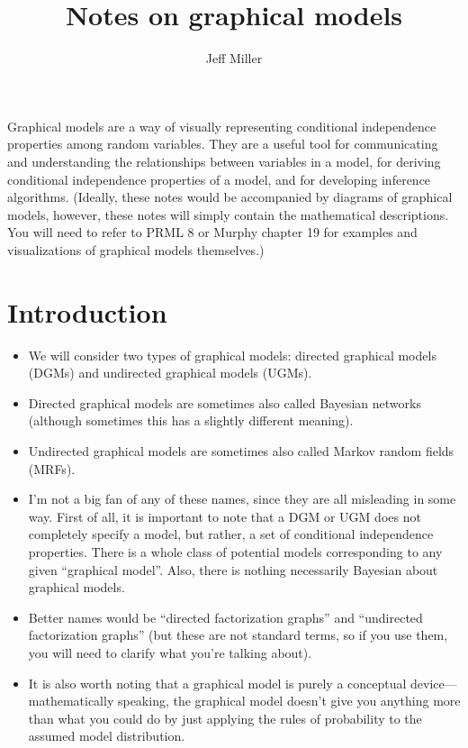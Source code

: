 \documentclass[12pt]{article}
\title{Notes on graphical models
}
\author{Jeff Miller}
\begin{document}
\maketitle

\tableofcontents

\vspace{2em}

Graphical models are a way of visually representing conditional independence properties among random variables. They are a useful tool for communicating and understanding the relationships between variables in a model, for deriving conditional independence properties of a model, and for developing inference algorithms. (Ideally, these notes would be accompanied by diagrams of graphical models, however, these notes will simply contain the mathematical descriptions. You will need to refer to PRML 8 or Murphy chapter 19 for examples and visualizations of graphical models themselves.)

\section{Introduction}

\begin{itemize}
\item We will consider two types of graphical models: directed graphical models (DGMs) and undirected graphical models (UGMs).
\item Directed graphical models are sometimes also called Bayesian networks (although sometimes this has a slightly different meaning).
\item Undirected graphical models are sometimes also called Markov random fields (MRFs).
\item I'm not a big fan of any of these names, since they are all misleading in some way. First of all, it is important to note that a DGM or UGM does not completely specify a model, but rather, a set of conditional independence properties. There is a whole class of potential models corresponding to any given ``graphical model''. Also, there is nothing necessarily Bayesian about graphical models.
\item Better names would be ``directed factorization graphs'' and ``undirected factorization graphs'' (but these are not standard terms, so if you use them, you will need to clarify what you're talking about).
\item It is also worth noting that a graphical model is purely a conceptual device---mathematically speaking, the graphical model doesn't give you anything more than what you could do by just applying the rules of probability to the assumed model distribution.
\end{itemize}
\end{document}
